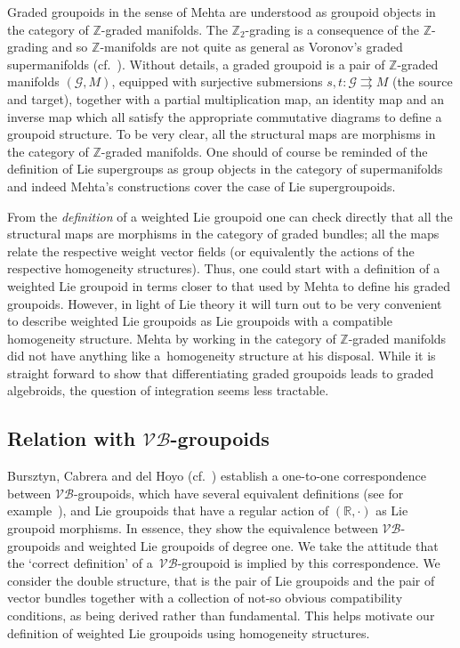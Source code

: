 \documentclass[pdftex]{sigma}
\numberwithin{equation}{section}
\begin{document}
\begin{Remark}
 Graded groupoids in the sense of Mehta \cite{Mehta:2006,Mehta:2009} are understood as groupoid objects in the category of $\mathbb{Z}$-graded manifolds.  The $\mathbb{Z}_{2}$-grading is a consequence of the  $\mathbb{Z}$-grading and so $\mathbb{Z}$-manifolds are not quite as general as Voronov's graded supermanifolds (cf.~\cite{Voronov:2001qf}).  Without details,  a graded groupoid is a pair of $\mathbb{Z}$-graded manifolds  $(\mathcal{G}, M)$, equipped with surjective submersions $s,t \colon \mathcal{G} \rightrightarrows M$ (the source and target), together with a partial multiplication map, an identity  map and an inverse map which all satisfy the appropriate commutative diagrams to def\/ine a groupoid structure. To be very clear, all the structural maps are morphisms in the category of $\mathbb{Z}$-graded manifolds.   One should of course  be reminded of the  def\/inition of Lie supergroups as group objects in the category of supermanifolds and indeed Mehta's constructions cover the case of Lie supergroupoids.

 From the \emph{definition} of a weighted Lie groupoid one can check directly that all the structural maps are morphisms in the category of graded bundles; all the maps relate the respective weight vector f\/ields (or equivalently the actions of the respective homogeneity structures). Thus, one could start with a def\/inition of a weighted Lie groupoid  in terms closer to that used by Mehta to def\/ine his graded groupoids. However, in light of Lie theory it will turn out to be very convenient to describe weighted Lie groupoids as Lie groupoids with a compatible homogeneity structure. Mehta by working in the category of $\mathbb{Z}$-graded manifolds did not have anything like a~homogeneity structure at his disposal. While it is straight forward to show that dif\/ferentiating graded groupoids leads to graded algebroids, the question of integration seems less tractable.
\end{Remark}

\subsection[Relation with $\mathcal{VB}$-groupoids]{Relation with $\boldsymbol{\mathcal{VB}}$-groupoids}

Bursztyn, Cabrera and del Hoyo  (cf.~\cite[Theorem~3.2.3]{Bursztyn:2014}) establish a one-to-one correspondence between $\mathcal{VB}$-groupoids, which have several equivalent def\/initions (see for example~\cite{Gracia-Saz:2010}), and Lie groupoids that have a regular action of $(\mathbb{R}, \cdot)$ as Lie groupoid morphisms. In essence, they show the equivalence between $\mathcal{VB}$-groupoids and weighted Lie groupoids of degree one. We take the attitude that the `correct def\/inition'  of a~$\mathcal{VB}$-groupoid is implied by this correspondence. We consider the double structure, that is the pair of Lie groupoids and the pair of vector bundles together with a collection of not-so obvious compatibility conditions,  as being derived  rather than fundamental.  This helps motivate our def\/inition of weighted Lie groupoids using homogeneity structures.
\end{document}
